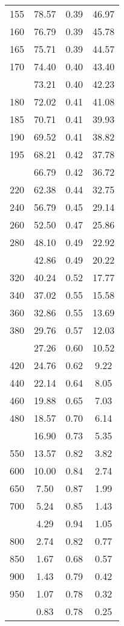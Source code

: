 \begin{table}[ht]
\begin{tabular}{lccc}
  155 & 78.57 & 0.39 & 46.97 \\ 
  160 & 76.79 & 0.39 & 45.78 \\ 
  165 & 75.71 & 0.39 & 44.57 \\ 
  170 & 74.40 & 0.40 & 43.40 \\ 
   \addlinespace
175 & 73.21 & 0.40 & 42.23 \\ 
  180 & 72.02 & 0.41 & 41.08 \\ 
  185 & 70.71 & 0.41 & 39.93 \\ 
  190 & 69.52 & 0.41 & 38.82 \\ 
  195 & 68.21 & 0.42 & 37.78 \\ 
   \addlinespace
200 & 66.79 & 0.42 & 36.72 \\ 
  220 & 62.38 & 0.44 & 32.75 \\ 
  240 & 56.79 & 0.45 & 29.14 \\ 
  260 & 52.50 & 0.47 & 25.86 \\ 
  280 & 48.10 & 0.49 & 22.92 \\ 
   \addlinespace
300 & 42.86 & 0.49 & 20.22 \\ 
  320 & 40.24 & 0.52 & 17.77 \\ 
  340 & 37.02 & 0.55 & 15.58 \\ 
  360 & 32.86 & 0.55 & 13.69 \\ 
  380 & 29.76 & 0.57 & 12.03 \\ 
   \addlinespace
400 & 27.26 & 0.60 & 10.52 \\ 
  420 & 24.76 & 0.62 & 9.22 \\ 
  440 & 22.14 & 0.64 & 8.05 \\ 
  460 & 19.88 & 0.65 & 7.03 \\ 
  480 & 18.57 & 0.70 & 6.14 \\ 
   \addlinespace
500 & 16.90 & 0.73 & 5.35 \\ 
  550 & 13.57 & 0.82 & 3.82 \\ 
  600 & 10.00 & 0.84 & 2.74 \\ 
  650 & 7.50 & 0.87 & 1.99 \\ 
  700 & 5.24 & 0.85 & 1.43 \\ 
   \addlinespace
750 & 4.29 & 0.94 & 1.05 \\ 
  800 & 2.74 & 0.82 & 0.77 \\ 
  850 & 1.67 & 0.68 & 0.57 \\ 
  900 & 1.43 & 0.79 & 0.42 \\ 
  950 & 1.07 & 0.78 & 0.32 \\ 
   \addlinespace
1000 & 0.83 & 0.78 & 0.25 \\ 
   \bottomrule
\end{tabular}
\end{table}
